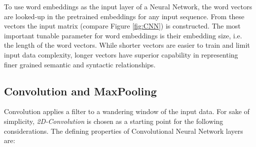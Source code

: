 \documentclass[11pt,a4paper,twoside,openright]{scrbook}
\begin{document}
\medskip
To use word embeddings as the input layer of a Neural Network, the word vectors are looked-up in the pretrained embeddings for any input sequence. From these vectors the input matrix (compare Figure \ref{fig:CNN}) is constructed. The most important tunable parameter for word embeddings is their embedding size, i.e. the length of the word vectors. While shorter vectors are easier to train and limit input data complexity, longer vectors have superior capability in representing finer grained semantic and syntactic relationships.

\subsection{Convolution and MaxPooling}
Convolution applies a filter to a wandering window of the input data. For sake of simplicity, \emph{2D-Convolution} is chosen as a starting point for the following considerations. The defining properties of Convolutional Neural Network layers are:
\end{document}
